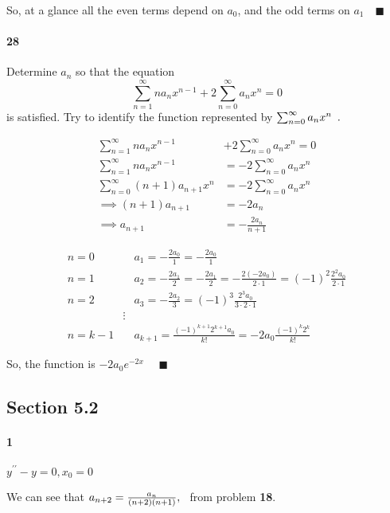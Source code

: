 \documentclass{article}
\begin{document}
So, at a glance all the even terms depend on $a_0$, and the odd terms
on $a_1\quad \blacksquare$

\paragraph{28} Determine $a_n$ so that the equation
\[\sum_{n=1}^{\infty} na_nx^{n-1} +2 \sum_{n=0}^{\infty} a_nx^n = 0\]
is satisfied. Try to identify the function represented by
$\sum_{n=0}^{\infty} a_nx^n\enskip.$


\begin{align*}
  \sum_{n=1}^{\infty} na_nx^{n-1} &+2 \sum_{n=0}^{\infty} a_nx^n = 0\\
  \sum_{n=1}^{\infty} na_nx^{n-1} &= -2 \sum_{n=0}^{\infty} a_nx^n\\
  \sum_{n=0}^{\infty} (n+1)a_{n+1}x^{n} &= -2 \sum_{n=0}^{\infty}
                                          a_nx^n\\
  \implies (n+1)a_{n+1} &= -2a_n\\
  \implies a_{n+1} &= -\frac{2a_n}{n+1}
\end{align*}

\begin{align*}
  n=0 &\quad a_1 =-\frac{2a_0}{1} = -\frac{2a_0}{1}\\
  n=1 &\quad a_{2} = -\frac{2a_1}{2} = -\frac{2a_1}{2} =
        -\frac{2(-2a_0)}{2\cdot 1}= (-1)^{2}\frac{2^2a_0}{2\cdot1}\\
  n=2 &\quad a_{3} = -\frac{2a_2}{3} =
        (-1)^3\frac{2^3a_0}{3\cdot 2\cdot 1}\\
  &\vdots\\
  n=k-1 &\quad a_{k+1} = \frac{(-1)^{k+1}2^{k+1}a_0}{k!} =
        -2a_0\frac{(-1)^{k}2^{k}}{k!}
\end{align*}

So, the function is $-2a_0e^{-2x}\quad$
$\blacksquare$


\subsection*{Section 5.2}

\paragraph{1} $y^{\prime\prime} − y = 0, x_0 = 0$


We can see that $a_{n+2} = \frac{a_n}{(n+2)(n+1)},\enskip$ from
problem \textbf{18}.
\end{document}
